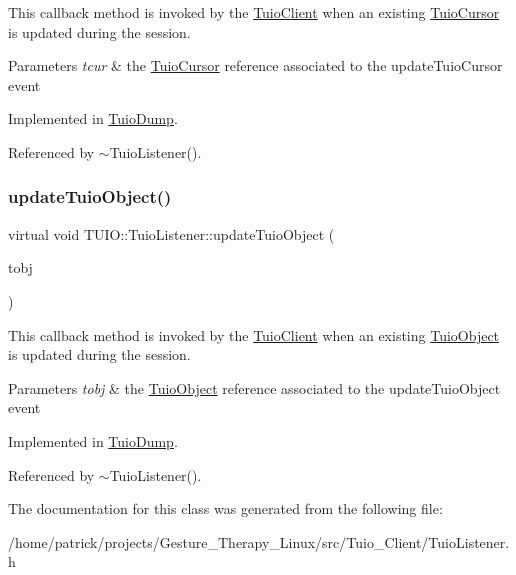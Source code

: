 This callback method is invoked by the \hyperlink{class_t_u_i_o_1_1_tuio_client}{Tuio\+Client} when an existing \hyperlink{class_t_u_i_o_1_1_tuio_cursor}{Tuio\+Cursor} is updated during the session.


\begin{DoxyParams}{Parameters}
{\em tcur} & the \hyperlink{class_t_u_i_o_1_1_tuio_cursor}{Tuio\+Cursor} reference associated to the update\+Tuio\+Cursor event \\
\hline
\end{DoxyParams}


Implemented in \hyperlink{class_tuio_dump_a6b54d0d57d714c5b51f5cf76a9b8b62a}{Tuio\+Dump}.



Referenced by $\sim$\+Tuio\+Listener().

\mbox{\label{class_t_u_i_o_1_1_tuio_listener_a27a13b031781a609c08bc40548d2e42d}} 
\subsubsection{\texorpdfstring{update\+Tuio\+Object()}{updateTuioObject()}}
{\footnotesize\ttfamily virtual void T\+U\+I\+O\+::\+Tuio\+Listener\+::update\+Tuio\+Object (\begin{DoxyParamCaption}\item[{\hyperlink{class_t_u_i_o_1_1_tuio_object}{Tuio\+Object} $\ast$}]{tobj }\end{DoxyParamCaption})\hspace{0.3cm}{\ttfamily [pure virtual]}}

This callback method is invoked by the \hyperlink{class_t_u_i_o_1_1_tuio_client}{Tuio\+Client} when an existing \hyperlink{class_t_u_i_o_1_1_tuio_object}{Tuio\+Object} is updated during the session.


\begin{DoxyParams}{Parameters}
{\em tobj} & the \hyperlink{class_t_u_i_o_1_1_tuio_object}{Tuio\+Object} reference associated to the update\+Tuio\+Object event \\
\hline
\end{DoxyParams}


Implemented in \hyperlink{class_tuio_dump_a0bade2cba83fe3dcdb11ca475e2f4862}{Tuio\+Dump}.



Referenced by $\sim$\+Tuio\+Listener().



The documentation for this class was generated from the following file\+:\begin{DoxyCompactItemize}
\item 
/home/patrick/projects/\+Gesture\+\_\+\+Therapy\+\_\+\+Linux/src/\+Tuio\+\_\+\+Client/Tuio\+Listener.\+h\end{DoxyCompactItemize}
